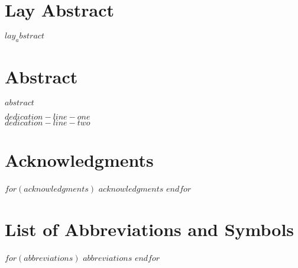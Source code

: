 \documentclass[
$if(fontsize)$
	$fontsize$,
$endif$
$if(lang)$
	$babel-lang$,
$endif$
$if(papersize)$
	$papersize$paper,
$endif$
$if(beamer)$
	ignorenonframetext,
$if(handout)$
	handout,
$endif$
$if(aspectratio)$
	aspectratio=$aspectratio$,
$endif$
$endif$
$for(classoption)$
	$classoption$$sep$,
$endfor$
]{$documentclass$}
\begin{document}
\chapter*{Lay Abstract}
$lay_abstract$

\chapter*{Abstract}
$abstract$

\newpage
\null\vfill
\begin{center}
\textsl{$dedication-line-one$ \\ $dedication-line-two$}
\end{center}
\vfill
	
\chapter*{Acknowledgments}
$for(acknowledgments)$
  $acknowledgments$\newline
	\newline
$endfor$
\newpage

\tableofcontents

\newpage
\addvspace{10pt}
\let\saveaddvspace=\addvspace
\def\addvspace#1{}
\listoffigures
\let\addvspace=\saveaddvspace

\newpage
\addvspace{10pt}
\let\saveaddvspace=\addvspace
\def\addvspace#1{}
\listoftables
\let\addvspace=\saveaddvspace
\label{NumPrefacePages}
\newpage

\chapter*{List of Abbreviations and Symbols}
$for(abbreviations)$
  $abbreviations$\newline
$endfor$
\newpage

\end{document}
